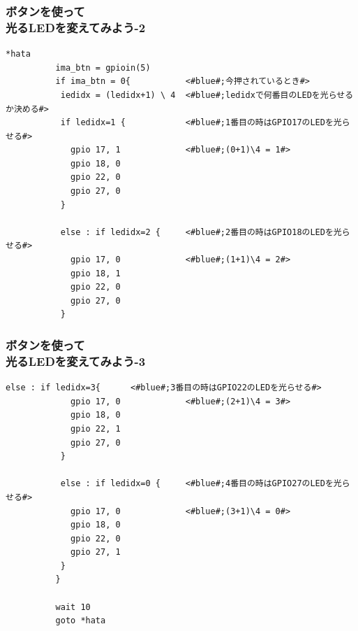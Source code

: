 \begin{frame}[fragile]
  \frametitle{ボタンを使って\\光るLEDを変えてみよう-2}
  \begin{lstlisting}[title=\sim/03/button\_led3.hsp 中盤, label=button_led3.hsp-2]
  *hata
          ima_btn = gpioin(5)
          if ima_btn = 0{           <#blue#;今押されているとき#>
           iedidx = (ledidx+1) \ 4  <#blue#;ledidxで何番目のLEDを光らせるか決める#>
           if ledidx=1 {            <#blue#;1番目の時はGPIO17のLEDを光らせる#>
             gpio 17, 1             <#blue#;(0+1)\4 = 1#>
             gpio 18, 0 
             gpio 22, 0
             gpio 27, 0
           }

           else : if ledidx=2 {     <#blue#;2番目の時はGPIO18のLEDを光らせる#>
             gpio 17, 0             <#blue#;(1+1)\4 = 2#>
             gpio 18, 1
             gpio 22, 0
             gpio 27, 0
           }
  \end{lstlisting}
\end{frame}

\begin{frame}[fragile]
  \frametitle{ボタンを使って\\光るLEDを変えてみよう-3}
  \begin{lstlisting}[title=button\_led3.hsp 後半, label=button_led3.hsp-3]
           else : if ledidx=3{      <#blue#;3番目の時はGPIO22のLEDを光らせる#>
             gpio 17, 0             <#blue#;(2+1)\4 = 3#>
             gpio 18, 0
             gpio 22, 1
             gpio 27, 0
           }

           else : if ledidx=0 {     <#blue#;4番目の時はGPIO27のLEDを光らせる#>
             gpio 17, 0             <#blue#;(3+1)\4 = 0#>
             gpio 18, 0
             gpio 22, 0
             gpio 27, 1
           }
          }

          wait 10
          goto *hata
  \end{lstlisting}
\end{frame}

